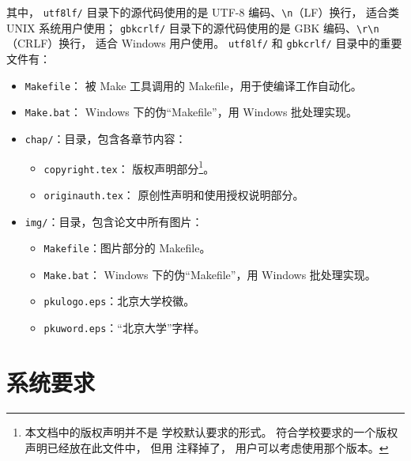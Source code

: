 	其中，%
	\verb|utf8lf/| 目录下的源代码使用的是 UTF-8 编码、\verb|\n|（LF）换行，
	适合类 UNIX 系统用户使用；%
	\verb|gbkcrlf/| 目录下的源代码使用的是 GBK 编码、\verb|\r\n|（CRLF）换行，
	适合 Windows 用户使用。%
	\verb|utf8lf/| 和 \verb|gbkcrlf/| 目录中的重要文件有：
	\begin{itemize}
		\item \verb|Makefile|：
			被 Make 工具调用的 Makefile，用于使编译工作自动化。
		\item \verb|Make.bat|：%
			Windows 下的伪“Makefile”，用 Windows 批处理实现。
		\item \verb|chap/|：目录，包含各章节内容：
		\begin{itemize}
			\item \verb|copyright.tex|：
				版权声明部分\footnote{%
					本文档中的版权声明并不是%
					学校默认要求的形式\supercite{pku-copyright}。
					符合学校要求的一个版权声明已经放在此文件中，
					但用 \texttt{\string\iffalse{} ...\ \string\fi} %
					注释掉了，
					用户可以考虑使用那个版本。
				}。
			\item \verb|originauth.tex|：
				原创性声明和使用授权说明部分\supercite{pku-originauth}。
		\end{itemize}
		\item \verb|img/|：目录，包含论文中所有图片：
		\begin{itemize}
			\item \verb|Makefile|：图片部分的 Makefile。
			\item \verb|Make.bat|：%
				Windows 下的伪“Makefile”，用 Windows 批处理实现。
			\item \verb|pkulogo.eps|：北京大学校徽。
			\item \verb|pkuword.eps|：“北京大学”字样。
		\end{itemize}
	\end{itemize}

	\section{系统要求}\label{sec:req}

